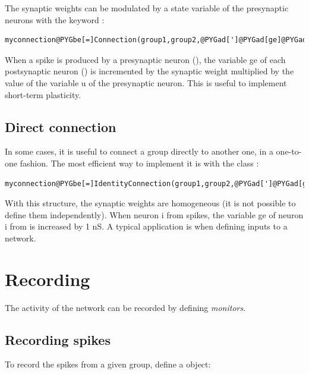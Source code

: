 \documentclass[letterpaper,10pt]{manual}
\begin{document}
The synaptic weights can be modulated by a state variable of the presynaptic neurons with
the keyword :

\begin{Verbatim}[commandchars=@\[\]]
myconnection@PYGbe[=]Connection(group1,group2,@PYGad[']@PYGad[ge]@PYGad['],modulation@PYGbe[=]@PYGad[']@PYGad[u]@PYGad['])
\end{Verbatim}

When a spike is produced by a presynaptic neuron (), the variable ge of each postsynaptic
neuron () is incremented by the synaptic weight multiplied by the value of the variable u
of the presynaptic neuron. This is useful to implement short-term plasticity.


\subsection{Direct connection}

In some cases, it is useful to connect a group directly to another one, in a one-to-one fashion.
The most efficient way to implement it is with the class :

\begin{Verbatim}[commandchars=@\[\]]
myconnection@PYGbe[=]IdentityConnection(group1,group2,@PYGad[']@PYGad[ge]@PYGad['],weight@PYGbe[=]@PYGaw[1]@PYGbe[*]nS)
\end{Verbatim}

With this structure, the synaptic weights are homogeneous (it is not possible to define them
independently). When neuron i from  spikes, the variable ge of neuron i from 
is increased by 1 nS. A typical application is when defining inputs to a network.

\resetcurrentobjects


\section{Recording}

The activity of the network can be recorded by defining \emph{monitors}.


\subsection{Recording spikes}

To record the spikes from a given group, define a \hyperlink{brian.SpikeMonitor}{} object:
\end{document}
